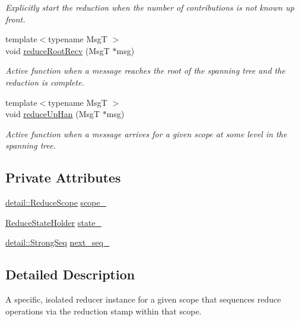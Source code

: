 \begin{DoxyCompactItemize}
\begin{DoxyCompactList}\small\item\em Explicitly start the reduction when the number of contributions is not known up front. \end{DoxyCompactList}\item 
{\footnotesize template$<$typename MsgT $>$ }\\void \hyperlink{structvt_1_1collective_1_1reduce_1_1_reduce_a48c7bb604fade1b64b9b391f4091ad5b}{reduce\+Root\+Recv} (MsgT $\ast$msg)
\begin{DoxyCompactList}\small\item\em Active function when a message reaches the root of the spanning tree and the reduction is complete. \end{DoxyCompactList}\item 
{\footnotesize template$<$typename MsgT $>$ }\\void \hyperlink{structvt_1_1collective_1_1reduce_1_1_reduce_af5e5d5538739578f2a1a23ea5a980e40}{reduce\+Up\+Han} (MsgT $\ast$msg)
\begin{DoxyCompactList}\small\item\em Active function when a message arrives for a given scope at some level in the spanning tree. \end{DoxyCompactList}\end{DoxyCompactItemize}
\subsection*{Private Attributes}
\begin{DoxyCompactItemize}
\item 
\hyperlink{structvt_1_1collective_1_1reduce_1_1detail_1_1_reduce_scope}{detail\+::\+Reduce\+Scope} \hyperlink{structvt_1_1collective_1_1reduce_1_1_reduce_a70ebc22c7420905f3e178dccb126c435}{scope\+\_\+}
\item 
\hyperlink{structvt_1_1collective_1_1reduce_1_1_reduce_state_holder}{Reduce\+State\+Holder} \hyperlink{structvt_1_1collective_1_1reduce_1_1_reduce_a49b9fcaf2f8b76d350d1e3b809add2aa}{state\+\_\+}
\item 
\hyperlink{namespacevt_1_1collective_1_1reduce_1_1detail_affec2854d7d65bafb17eb259714e9443}{detail\+::\+Strong\+Seq} \hyperlink{structvt_1_1collective_1_1reduce_1_1_reduce_a368873db0ddebf8365fdd3021927a691}{next\+\_\+seq\+\_\+}
\end{DoxyCompactItemize}


\subsection{Detailed Description}
A specific, isolated reducer instance for a given scope that sequences reduce operations via the reduction stamp within that scope. 

